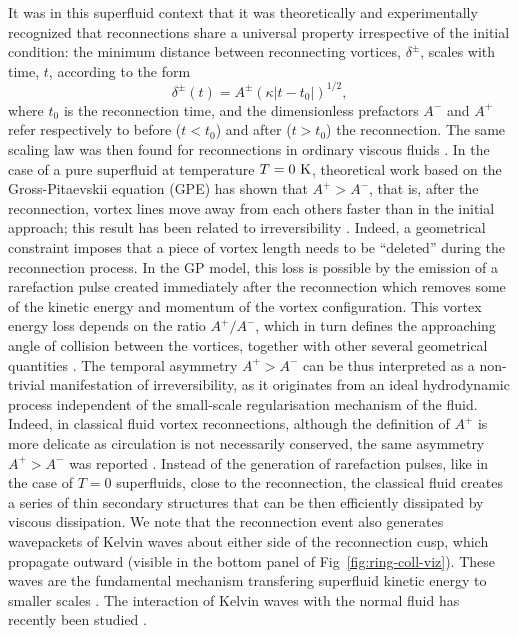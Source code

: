 \documentclass[
  reprint,
superscriptaddress,
 amsmath,amssymb,
 aps,
prb,
]{revtex4-2}
\begin{document}
It was in this superfluid context that it was theoretically and experimentally recognized
\cite{nazarenko2003,bewley2008,paoletti2010,zuccherQuantumVortexReconnections2012a,villoisUniversalNonuniversalAspects2017a,galantucciCrossoverInteractionDriven2019a,tylutki2021universal}
that reconnections share a universal property irrespective of the initial
condition: the minimum distance between reconnecting 
vortices, $\delta^{\pm}$, scales with time, $t$, according to the form
\begin{equation}
\label{eq:scaling}
	\delta^{\pm}(t) = A^{\pm} (\kappa|t-t_0|)^{1/2},
\end{equation} 
\noindent
where $t_0$ is the reconnection time, and the dimensionless
prefactors $A^-$ and $A^+$ refer respectively to before
($t<t_0$) and after ($t>t_0$) the reconnection. The same scaling law
was then found for reconnections in ordinary viscous fluids 
\cite{yaoSeparationScalingViscous2020}. In the case of a pure
superfluid at temperature $T=0~\rm K$, theoretical work based on
the Gross-Pitaevskii equation (GPE) has shown that
$A^+>A^-$, that is, after the reconnection, vortex lines move away from 
each others faster than in the initial approach; this result has been
related to irreversibility \cite{villoisIrreversibleDynamicsVortex2020,promentMatchingTheoryCharacterize2020}. Indeed, a geometrical constraint imposes 
\cite{promentMatchingTheoryCharacterize2020}
that a piece of vortex length needs to be ``deleted'' 
during the reconnection process. In the GP model, this loss is possible 
by the emission of a rarefaction pulse created immediately after 
the reconnection
\cite{leadbeaterSoundEmissionDue2001b,zuccherQuantumVortexReconnections2012a} which removes some of the kinetic energy and momentum of the vortex configuration.
This vortex energy loss depends on
the ratio $A^+/A^-$, which in turn defines the approaching angle of collision
between the vortices, together with other several geometrical quantities \cite{villoisUniversalNonuniversalAspects2017a,promentMatchingTheoryCharacterize2020}. 
The temporal asymmetry $A^+>A^-$ can be thus interpreted as a non-trivial manifestation of irreversibility, as it originates from an ideal hydrodynamic process independent of the small-scale regularisation mechanism of the fluid.
%
Indeed, in classical fluid vortex reconnections, although the definition of $A^+$ is more delicate as circulation is not necessarily conserved, the same asymmetry $A^+>A^-$ was reported \cite{yaoSeparationScalingViscous2020}. Instead of the generation of rarefaction pulses, like in the case of $T=0$ superfluids, close to the reconnection, the classical fluid creates a series of thin secondary structures that can be then efficiently dissipated by viscous dissipation.
We note that the reconnection event also generates wavepackets of Kelvin waves about either side of the reconnection cusp, which propagate outward (visible in the bottom panel of Fig~\ref{fig:ring-coll-viz}). These waves are the fundamental mechanism transfering superfluid kinetic energy to smaller scales \cite{vinen2001decay,vinen2002quantum}. The interaction of Kelvin waves with the normal fluid has recently been studied \cite{stasiakCrossComponentEnergyTransfer2024,stasiak2025inverse}.
\end{document}
